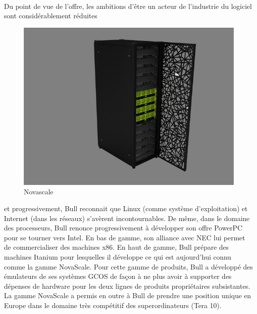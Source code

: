 \documentclass{article}
\begin{document}
		\paragraph{}
		Du point de vue de l'offre, les ambitions d'être un acteur de l'industrie du logiciel sont considérablement réduites 
		\begin{figure}
		\includegraphics[scale=1]{novascale.jpg}
		\caption{Novascale}
		\end{figure} 
		et progressivement, Bull reconnait que Linux (comme système d'exploitation) et Internet (dans les réseaux) s'avèrent 
		incontournables. De même, dans le domaine des processeurs, Bull renonce progressivement à développer son offre PowerPC 
		pour se tourner vers Intel.\newline{}
		En bas de gamme, son alliance avec NEC lui permet de commercialiser des machines x86. En haut de gamme, Bull prépare 
		des machines Itanium pour lesquelles il développe ce qui est aujourd'hui connu comme la gamme NovaScale.\newline{}
		Pour cette gamme de produits, Bull a développé des émulateurs de ses systèmes GCOS de façon à ne plus avoir à 
		supporter des dépenses de hardware pour les deux lignes de produits propriétaires subsistantes.\newline{}
		\newline{}
		\newline{}
		\newline{}
		La gamme NovaScale a permis en outre à Bull de prendre une position unique en Europe dans le domaine très compétitif 
		des superordinateurs (Tera 10).
\end{document}
